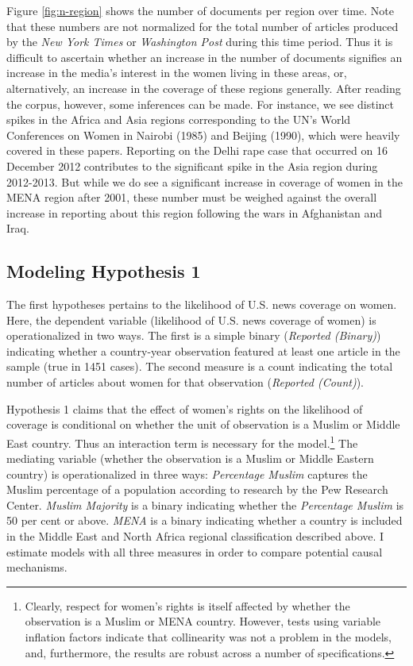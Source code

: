 \documentclass[11pt, oneside]{article}
\begin{document}
Figure \ref{fig:n-region} shows the number of documents per region over time. Note that these numbers are not normalized for the total number of articles produced by the \emph{New York Times} or \emph{Washington Post} during this time period. Thus it is difficult to ascertain whether an increase in the number of documents signifies an increase in the media's interest in the women living in these areas, or, alternatively, an increase in the coverage of these regions generally. After reading the corpus, however, some inferences can be made. For instance, we see distinct spikes in the Africa and Asia regions corresponding to the UN's World Conferences on Women in Nairobi (1985) and Beijing (1990), which were heavily covered in these papers. Reporting on the Delhi rape case that occurred on 16 December 2012 contributes to the significant spike in the Asia region during 2012-2013. But while we do see a significant increase in coverage of women in the MENA region after 2001, these number must be weighed against the overall increase in reporting about this region following the wars in Afghanistan and Iraq.

\subsection{Modeling Hypothesis 1}

The first hypotheses pertains to the likelihood of U.S. news coverage on women. Here, the dependent variable (likelihood of U.S. news coverage of women) is operationalized in two ways. The first is a simple binary (\emph{Reported (Binary)}) indicating whether a country-year observation featured at least one article in the sample (true in 1451 cases). The second measure is a count indicating the total number of articles about women for that observation (\emph{Reported (Count)}). 

Hypothesis 1 claims that the effect of women's rights on the likelihood of coverage is conditional on whether the unit of observation is a Muslim or Middle East country. Thus an interaction term is necessary for the model.\footnote{\hspace{5}Clearly, respect for women's rights is itself affected by whether the observation is a Muslim or MENA country. However, tests using variable inflation factors indicate that collinearity was not a problem in the models, and, furthermore, the results are robust across a number of specifications.} The mediating variable (whether the observation is a Muslim or Middle Eastern country) is operationalized in three ways: \emph{Percentage Muslim} captures the Muslim percentage of a population according to research by the Pew Research Center. \emph{Muslim Majority} is a binary indicating whether the \emph{Percentage Muslim} is 50 per cent or above. \emph{MENA} is a binary indicating whether a country is included in the Middle East and North Africa regional classification described above. I estimate models with all three measures in order to compare potential causal mechanisms. 
\end{document}
